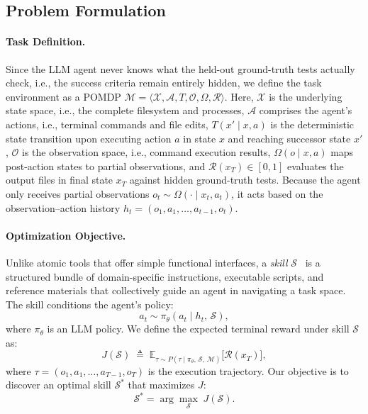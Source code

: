 \documentclass{article}
\newcommand{\skill}{\mathcal{S}}
\begin{document}
\subsection{Problem Formulation}
\label{sec:formulation}


\paragraph{Task Definition.}
Since the LLM agent never knows what the held-out ground-truth tests actually check, i.e., the success criteria remain entirely hidden,
we define the task environment as a POMDP $\mathcal{M} = \langle \mathcal{X}, \mathcal{A}, T, \mathcal{O}, \Omega, \mathcal{R} \rangle$. Here, $\mathcal{X}$ is the underlying state space, i.e., the complete filesystem and processes, $\mathcal{A}$ comprises the agent's actions, i.e., terminal commands and file edits, $T(x'\mid x,a)$ is the deterministic state transition upon executing action $a$ in state $x$ and reaching successor state $x'$, $\mathcal{O}$ is the observation space, i.e., command execution results, $\Omega(o \mid x, a)$ maps post-action states to partial observations, and $\mathcal{R}(x_T) \in [0,1]$ evaluates the output files in final state $x_T$ against hidden ground-truth tests. Because the agent only receives partial observations $o_t \sim \Omega(\cdot \mid x_t, a_t)$, it acts based on the observation--action history $h_t = (o_1, a_1, \ldots, a_{t-1}, o_t)$.

\paragraph{Optimization Objective.}
\label{sec:skill_structure}
Unlike atomic tools that offer simple functional interfaces, a \emph{skill} $\skill$~\citep{anthropic2025skills} is a structured bundle of domain-specific instructions, executable scripts, and reference materials that collectively guide an agent in navigating a task space. The skill conditions the agent's policy:
\begin{equation}
    a_t \sim \pi_\theta(a_t \mid h_t,\, \skill),
    \label{eq:policy}
\end{equation}
where $\pi_\theta$ is an LLM policy. We define the expected terminal reward under skill $\skill$ as:
\begin{equation}
    J(\skill) \;\triangleq\; \mathbb{E}_{\tau \sim P(\tau \mid \pi_\theta,\, \skill,\, \mathcal{M})} \bigl[\mathcal{R}(x_T)\bigr],
    \label{eq:J}
\end{equation}
where $\tau = (o_1, a_1, \ldots, a_{T-1}, o_T)$ is the execution trajectory. Our objective is to discover an optimal skill $\skill^{*}$ that maximizes $J$:
\begin{equation}
    \skill^{*} = \arg\max_{\skill}\; J(\skill).
    \label{eq:objective}
\end{equation}
\end{document}
